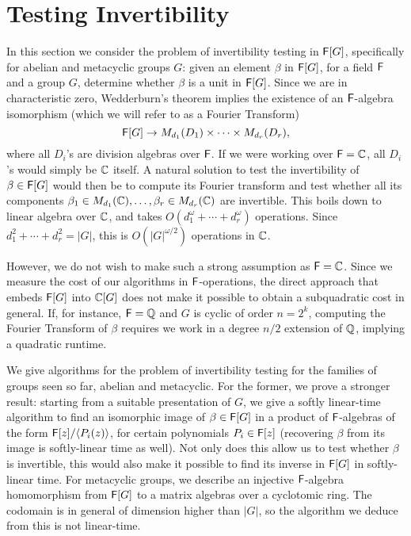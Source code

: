\section{Testing Invertibility}
\label{sec:invertibility}

In this section we consider the problem of invertibility testing in
${\mathsf{F}}[G]$, specifically for abelian and metacyclic groups $G$: given an
element $\beta$ in ${\mathsf{F}}[G]$, for a field ${\mathsf{F}}$ and a group $G$, determine
whether $\beta$ is a unit in ${\mathsf{F}}[G]$.  
Since we are in characteristic zero, Wedderburn's theorem implies the
existence of an ${\mathsf{F}}$-algebra isomorphism (which we will refer to as a
Fourier Transform)
\[
  {\mathsf{F}}[G] \to M_{d_1}(D_1) \times \dots \times M_{d_r}(D_r),
\]
where all $D_i$'s are division algebras over ${\mathsf{F}}$. If we were working over
${\mathsf{F}}=\mathbb{C}$, all $D_i$'s would simply be $\mathbb{C}$ itself.  A natural solution
to test the invertibility of $\beta \in {\mathsf{F}}[G]$ would then be to compute its
Fourier transform and test whether all its components
$\beta_1 \in M_{d_1}(\mathbb{C}),\dots,\beta_r \in M_{d_r}(\mathbb{C})$ are
invertible. This boils down to linear algebra over $\mathbb{C}$, and takes
$O(d_1^\omega + \cdots + d_r^\omega)$ operations.  Since
$d_1^2 + \cdots + d_r^2 = |G|$, this is $O(|G|^{\omega/2})$ operations in
$\mathbb{C}$.

However, we do not wish to make such a strong assumption as ${\mathsf{F}}=\mathbb{C}$. Since
we measure the cost of our algorithms in ${\mathsf{F}}$-operations, the direct
approach that embeds ${\mathsf{F}}[G]$ into $\mathbb{C}[G]$ does not make it possible to
obtain a subquadratic cost in general. If, for instance, ${\mathsf{F}}=\mathbb{Q}$ and $G$ is
cyclic of order $n=2^k$, computing the Fourier Transform of $\beta$
requires we work in a degree $n/2$ extension of $\mathbb{Q}$, implying a quadratic
runtime.

We give algorithms for the problem of invertibility testing for the
families of groups seen so far, abelian and metacyclic. For the former,
we prove a stronger result: starting from a suitable presentation of
$G$, we give a softly linear-time algorithm to find an isomorphic
image of $\beta \in {\mathsf{F}}[G]$ in a product of ${\mathsf{F}}$-algebras of the form
${\mathsf{F}}[z]/\langle P_i(z)\rangle$, for certain polynomials $P_i \in {\mathsf{F}}[z]$
(recovering $\beta$ from its image is softly-linear time as well). Not
only does this allow us to test whether $\beta$ is invertible, this
would also make it possible to find its inverse in ${\mathsf{F}}[G]$ in
softly-linear time.  For metacyclic groups, we describe an injective
${\mathsf{F}}$-algebra homomorphism from ${\mathsf{F}}[G]$ to a matrix algebras over a
cyclotomic ring. The codomain is in general of dimension higher than
$|G|$, so the algorithm we deduce from this is not linear-time.

